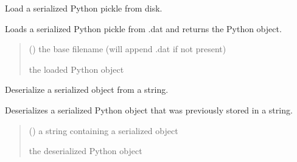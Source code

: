 \documentclass[letterpaper,12pt,english]{sphinxmanual}
\begin{document}
\begin{fulllineitems}
\label{\detokenize{api/core:cbmpy.CBTools.loadObj}}
\pysigstartsignatures
\pysiglinewithargsret
{}
{}
{}
\pysigstopsignatures
\sphinxAtStartPar
Load a serialized Python pickle from disk.

\sphinxAtStartPar
Loads a serialized Python pickle from .dat and returns the Python object.
\begin{quote}\begin{description}
\sphinxAtStartPar
{} () \textendash{} the base filename (will append .dat if not present)

\sphinxAtStartPar
{} \textendash{} the loaded Python object

\end{description}\end{quote}

\end{fulllineitems}


\begin{fulllineitems}
\label{\detokenize{api/core:cbmpy.CBTools.deSerialize}}
\pysigstartsignatures
\pysiglinewithargsret
{}
{}
{}
\pysigstopsignatures
\sphinxAtStartPar
Deserialize a serialized object from a string.

\sphinxAtStartPar
Deserializes a serialized Python object that was previously stored in a string.
\begin{quote}\begin{description}
\sphinxAtStartPar
{} () \textendash{} a string containing a serialized object

\sphinxAtStartPar
{} \textendash{} the deserialized Python object

\end{description}\end{quote}

\end{fulllineitems}
\end{document}
